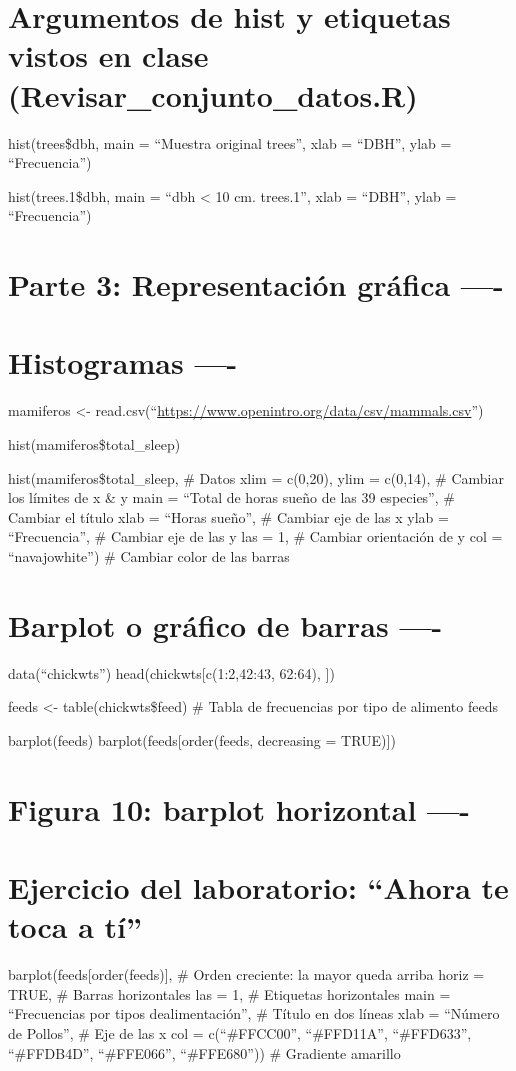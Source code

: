 \documentclass[
]{article}
\begin{document}
\section{Argumentos de hist y etiquetas vistos en clase
(Revisar\_conjunto\_datos.R)}\label{argumentos-de-hist-y-etiquetas-vistos-en-clase-revisar_conjunto_datos.r}

hist(trees\$dbh, main = ``Muestra original trees'', xlab = ``DBH'', ylab
= ``Frecuencia'')

hist(trees.1\$dbh, main = ``dbh \textless{} 10 cm. trees.1'', xlab =
``DBH'', ylab = ``Frecuencia'')

\section{Parte 3: Representación gráfica
----}\label{parte-3-representaciuxf3n-gruxe1fica--}

\section{Histogramas ----}\label{histogramas--}

mamiferos \textless-
read.csv(``\url{https://www.openintro.org/data/csv/mammals.csv}'')

hist(mamiferos\$total\_sleep)

hist(mamiferos\$total\_sleep, \# Datos xlim = c(0,20), ylim = c(0,14),
\# Cambiar los límites de x \& y main = ``Total de horas sueño de las 39
especies'', \# Cambiar el título xlab = ``Horas sueño'', \# Cambiar eje
de las x ylab = ``Frecuencia'', \# Cambiar eje de las y las = 1, \#
Cambiar orientación de y col = ``navajowhite'') \# Cambiar color de las
barras

\section{Barplot o gráfico de barras
----}\label{barplot-o-gruxe1fico-de-barras--}

data(``chickwts'') head(chickwts{[}c(1:2,42:43, 62:64), {]})

feeds \textless- table(chickwts\$feed) \# Tabla de frecuencias por tipo
de alimento feeds

barplot(feeds) barplot(feeds{[}order(feeds, decreasing = TRUE){]})

\section{Figura 10: barplot horizontal
----}\label{figura-10-barplot-horizontal--}

\section{Ejercicio del laboratorio: ``Ahora te toca a
tí''}\label{ejercicio-del-laboratorio-ahora-te-toca-a-tuxed}

barplot(feeds{[}order(feeds){]}, \# Orden creciente: la mayor queda
arriba horiz = TRUE, \# Barras horizontales las = 1, \# Etiquetas
horizontales main = ``Frecuencias por tipos de\n alimentación'', \#
Título en dos líneas xlab = ``Número de Pollos'', \# Eje de las x col =
c(``\#FFCC00'', ``\#FFD11A'', ``\#FFD633'', ``\#FFDB4D'', ``\#FFE066'',
``\#FFE680'')) \# Gradiente amarillo
\end{document}
